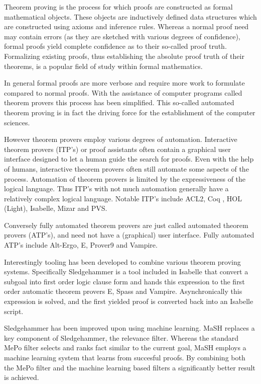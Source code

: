 Theorem proving is the process for which proofs are constructed as formal mathematical objects.
These objects are inductively defined data structures which are constructed using axioms and inference rules.
Whereas a normal proof need may contain errors (as they are sketched with various degrees of confidence),
formal proofs yield complete confidence as to their so-called proof truth.
Formalizing existing proofs, thus establishing the absolute proof truth of their theorems, is a popular field of study within formal mathematics.

In general formal proofs are more verbose and require more work to formulate compared to normal proofs.
With the assistance of computer programs called theorem provers this process has been simplified.
This so-called automated theorem proving is in fact the driving force for the establishment of the computer sciences.

However theorem provers employ various degrees of automation.
Interactive theorem provers (ITP's) or proof assistants often contain a graphical user interface designed to let a human guide the search for proofs.
Even with the help of humans, interactive theorem provers often still automate some aspects of the process.
Automation of theorem provers is limited by the expressiveness of the logical language.
Thus ITP's with not much automation generally have a relatively complex logical language.
Notable ITP's include ACL2, Coq \cite{bertot2013interactive}, HOL (Light), Isabelle, Mizar and PVS.

Conversely fully automated theorem provers are just called automated theorem provers (ATP's), and need not have a (graphical) user interface.
Fully automated ATP's include Alt-Ergo, E, Prover9 and Vampire.

Interestingly tooling has been developed to combine various theorem proving systems.
Specifically Sledgehammer \cite{meng2006automation} is a tool included in Isabelle that convert a subgoal into first order logic clause form and
hands this expression to the first order automatic theorem provers E, Spass and Vampire.
Asynchronically this expression is solved, and the first yielded proof is converted back into an Isabelle script.

Sledgehammer has been improved upon using machine learning.
MaSH \cite{kuhlwein2013mash} replaces a key component of Sledgehammer, the relevance filter.
Whereas the standard MePo filter \cite{meng2009lightweight} selects and ranks fact similar to the current goal,
MaSH employs a machine learning system that learns from succesful proofs.
By combining both the MePo filter and the machine learning based filters a significantly better result is achieved.

